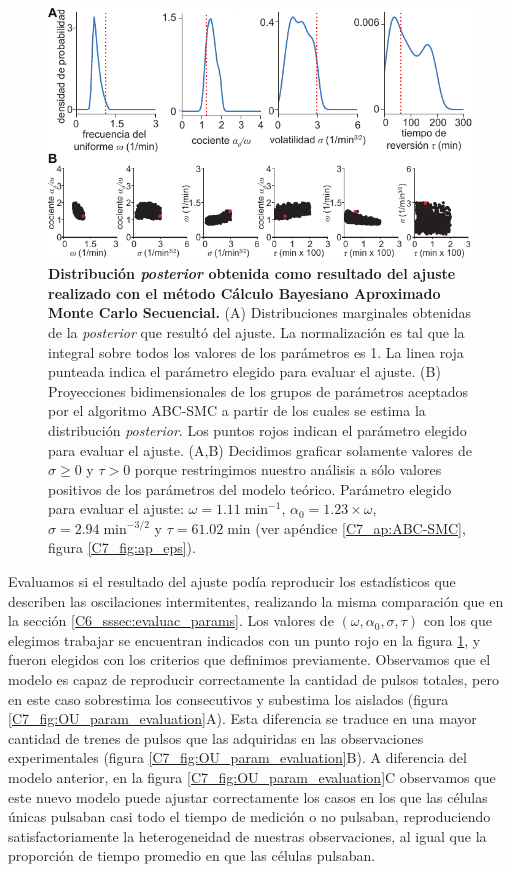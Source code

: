 \documentclass[./main.tex]{subfiles}
\begin{document}
\begin{figure}
    \centering
    \includegraphics[width=1\columnwidth]{figures/chapter7/C7_OU_fit.pdf} 
    \caption{\textbf{Distribución \textit{posterior} obtenida como resultado del ajuste realizado con el método Cálculo Bayesiano Aproximado Monte Carlo Secuencial.} (A) Distribuciones marginales obtenidas de la \textit{posterior} que resultó del ajuste. La normalización es tal que la integral sobre todos los valores de los parámetros es 1. La linea roja punteada indica el parámetro elegido para evaluar el ajuste. (B) Proyecciones bidimensionales de los grupos de parámetros aceptados por el algoritmo ABC-SMC a partir de los cuales se estima la distribución \textit{posterior}. Los puntos rojos indican el parámetro elegido para evaluar el ajuste. (A,B) Decidimos graficar solamente valores de $\sigma \geq 0$ y $\tau > 0$ porque restringimos nuestro análisis a sólo valores positivos de los parámetros del modelo teórico. Parámetro elegido para evaluar el ajuste: $\omega = 1.11\; \text{min}^{-1}$, $\alpha_0 = 1.23 \times \omega$, $ \sigma = 2.94 \;  \text{min}^{-3/2}$ y $\tau = 61.02 \; \text{min} $ (ver apéndice \ref{C7_ap:ABC-SMC}, figura \ref{C7_fig:ap_eps}).}
    \label{C7_fig:OU_fit}
\end{figure} 


Evaluamos si el resultado del ajuste podía reproducir los estadísticos que describen las oscilaciones intermitentes, realizando la misma comparación que en la sección \ref{C6_sssec:evaluac_params}. Los valores de $(\omega,\alpha_0,\sigma,\tau)$ con los que elegimos trabajar se encuentran indicados con un punto rojo en la figura \ref{C7_fig:OU_fit}, y fueron elegidos con los criterios que definimos previamente. Observamos que el modelo es capaz de reproducir correctamente la cantidad de pulsos totales, pero en este caso sobrestima los consecutivos y subestima los aislados (figura \ref{C7_fig:OU_param_evaluation}A). Esta diferencia se traduce en una mayor cantidad de trenes de pulsos que las adquiridas en las observaciones experimentales (figura \ref{C7_fig:OU_param_evaluation}B). A diferencia del modelo anterior, en la figura \ref{C7_fig:OU_param_evaluation}C observamos que este nuevo modelo puede ajustar correctamente los casos en los que las células únicas pulsaban casi todo el tiempo de medición o no pulsaban, reproduciendo satisfactoriamente la heterogeneidad de nuestras observaciones, al igual que la proporción de tiempo promedio en que las células pulsaban.
\end{document}
